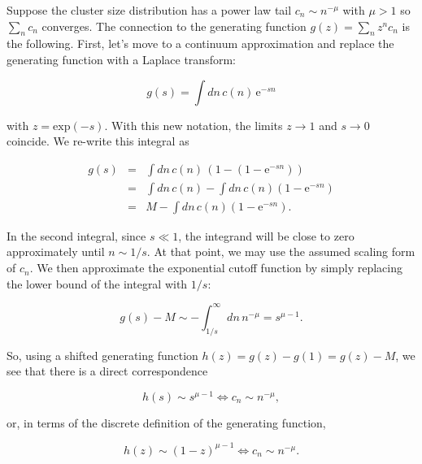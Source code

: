 \documentclass[12pt]{article}
\def\be{\begin{equation}}
\def\ee{\end{equation}}
\def\bea{\begin{eqnarray}}
\def\eea{\end{eqnarray}}
\def\exp{\text{exp}}
\def\e{\text{e}}
\begin{document}
Suppose the cluster size distribution has a power law tail $c_n \sim n^{-\mu}$ with $\mu > 1$ so $\sum_n c_n$ converges. The connection to the generating function $g(z) = \sum_n z^n c_n$ is the following. First, let's move to a continuum approximation and replace the generating function with a Laplace transform:

\be
g(s) = \int dn\, c(n)\,  \e^{-sn} 
\ee

\noindent with $z = \exp(-s)$. With this new notation, the limits $z \to 1$ and $s \to 0$ coincide. We re-write this integral as 

\bea
g(s) 	&=& \int dn \, c(n) \, \left(1-\left(1-\e^{-sn}\right)\right)\nonumber\\
		&=& \int dn \, c(n) - \int dn \, c(n)\left(1-\e^{-sn}\right)\nonumber\\
		&=& M - \int dn \, c(n)\left(1-\e^{-sn}\right).
\eea

\noindent In the second integral, since $s \ll 1$, the integrand will be close to zero approximately until $n\sim 1/s$. At that point, we may use the assumed scaling form of $c_n$. We then approximate the exponential cutoff function by simply replacing the lower bound of the integral with $1/s$:

\be
g(s) - M \sim -\int_{1/s}^{\infty} dn \, n^{-\mu} = s^{\mu-1}.
\ee

So, using a shifted generating function $h(z) = g(z) - g(1) = g(z) - M$, we see that there is a direct correspondence

\be
h(s) \sim s^{\mu-1} \Longleftrightarrow c_n \sim n^{-\mu},
\ee

\noindent or, in terms of the discrete definition of the generating function,

\be
h(z) \sim (1-z)^{\mu-1} \Longleftrightarrow c_n \sim n^{-\mu}.
\ee
\end{document}
